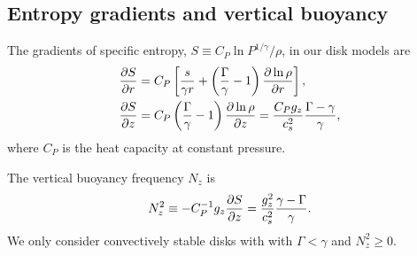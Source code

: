 \subsection{Entropy gradients and vertical buoyancy}
The gradients of specific entropy, $S\equiv
C_P\ln{P^{1/\gamma}/\rho}$, in our disk models are
\begin{subequations}
\begin{align}
  &\frac{\partial S}{\partial r} = C_P\left[\frac{s}{\gamma r} +
    \left(\frac{\Gamma}{\gamma}-1\right)\frac{\partial \ln{\rho}}{\partial
       r}\right], \label{dSdr}\\
  &\frac{\partial S}{\partial z} = C_P
  \left(\frac{\Gamma}{\gamma}-1\right)\frac{\partial \ln{\rho}}{\partial z} = {C_P g_z \over c_s^2} {\Gamma - \gamma \over \gamma},\label{dSdz}
\end{align} 
\end{subequations}
 where $C_P$ is the heat capacity at
constant pressure. 

The vertical buoyancy frequency $N_z$ is 
\begin{align}
  N_z^2 \equiv - C_P^{-1}g_z \frac{\p S}{\p z} = {g_z^2 \over c_s^2}{\gamma - \Gamma \over \gamma}. %
    \label{nzsq_def}
\end{align}
We only consider convectively stable disks with with $\Gamma <
\gamma$ and  $N_z^2\geq0$. %


